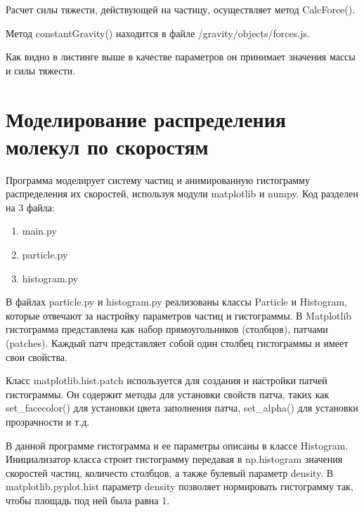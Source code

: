 \noindent Расчет силы тяжести, действующей на частицу, осуществляет метод CalcForce().


\noindent Метод constantGravity() находится в файле /gravity/objects/forces.js.

\noindent Как видно в листинге выше в качестве параметров он принимает значения массы и силы тяжести.

\section{Моделирование распределения молекул по скоростям}

Программа моделирует систему частиц и анимированную гистограмму распределения их скоростей, используя модули matplotlib и numpy. Код разделен на 3 файла:

\begin{enumerate}
    \item main.py
    \item particle.py
    \item histogram.py
\end{enumerate}

В файлах particle.py и histogram.py реализованы классы Particle и Histogram, которые отвечают за настройку параметров частиц и гистограммы. В Matplotlib гистограмма представлена как набор прямоугольников (столбцов), патчами (patches). Каждый патч представляет собой один столбец гистограммы и имеет свои свойства.

Класс matplotlib.hist.patch используется для создания и настройки патчей гистограммы. Он содержит методы для установки свойств патча, таких как set\_facecolor() для установки цвета заполнения патча, set\_alpha() для установки прозрачности и т.д.

В данной программе гистограмма и ее параметры описаны в классе Histogram. Инициализатор класса строит гистограмму передавая в  np.histogram значения скоростей частиц, количесто столбцов,  а также булевый параметр density. В matplotlib.pyplot.hist параметр
density позволяет нормировать гистограмму так, чтобы площадь под ней была равна 1.

